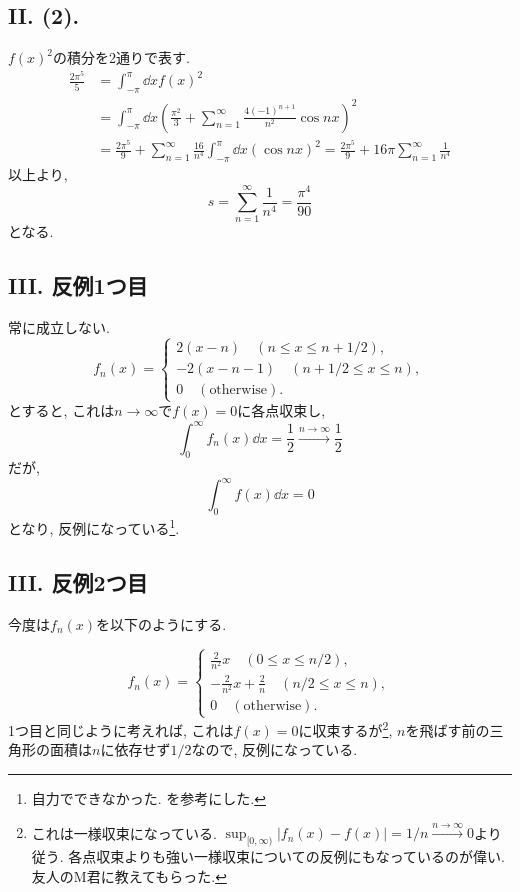 \subsection*{II. (2). }
$f(x)^2$の積分を2通りで表す. 
\begin{align*}
  \frac{2\pi^5}{5}
  &=\int_{-\pi}^{\pi}\dd{x}f(x)^2\\
  &=\int_{-\pi}^{\pi}\dd{x}\left( \frac{\pi^2}{3}+ \sum_{n=1}^{\infty}\frac{4(-1)^{n+1}}{n^2}\cos{nx}\right)^2\\
  &=\frac{2\pi^5}{9}+\sum_{n=1}^{\infty}\frac{16}{n^4}\int_{-\pi}^{\pi}\dd{x}(\cos{nx})^2=\frac{2\pi^5}{9}+16\pi\sum_{n=1}^{\infty}\frac{1}{n^4}
\end{align*}
以上より, 
\begin{equation}
  s=\sum_{n=1}^{\infty}\frac{1}{n^4}=\frac{\pi^4}{90}
\end{equation}
となる. 

\subsection*{III. 反例1つ目}
常に成立しない. 
\begin{equation}
  f_n(x)=\begin{cases}
    2(x-n)\quad (n\leq x\leq n+1/2), \\
    -2(x-n-1)\quad (n+1/2\leq x\leq n), \\
    0\quad (\text{otherwise}). 
  \end{cases}
\end{equation}
とすると, これは$n\to\infty$で$f(x)=0$に各点収束し, 
\begin{equation}
  \int_{0}^{\infty}f_n(x)\dd{x}=\frac{1}{2}\xrightarrow{n\to\infty}\frac{1}{2}
\end{equation}
だが, 
\begin{equation}
  \int_{0}^{\infty}f(x)\dd{x}=0
\end{equation}
となり, 反例になっている\footnote{自力でできなかった. \cite{kyokugensekibun}を参考にした. }.

\subsection*{III. 反例2つ目}
今度は$f_n(x)$を以下のようにする. 

\begin{equation}
  f_n(x)=\begin{cases}
    \frac{2}{n^2}x\quad (0\leq x\leq n/2), \\
    -\frac{2}{n^2}x+\frac{2}{n}\quad (n/2\leq x\leq n), \\
    0\quad (\text{otherwise}). 
  \end{cases}
\end{equation}
1つ目と同じように考えれば, これは$f(x)=0$に収束するが\footnote{これは一様収束になっている. $\sup_{[0, \infty)}|f_n(x)-f(x)|=1/n\xrightarrow{n\to\infty} 0$より従う. 各点収束よりも強い一様収束についての反例にもなっているのが偉い. 友人のM君に教えてもらった. }, $n$を飛ばす前の三角形の面積は$n$に依存せず$1/2$なので, 反例になっている. 



